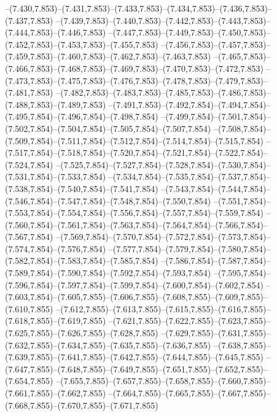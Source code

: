   --(7.430,7.853)--(7.431,7.853)--(7.433,7.853)--(7.434,7.853)--(7.436,7.853)--(7.437,7.853)%
  --(7.439,7.853)--(7.440,7.853)--(7.442,7.853)--(7.443,7.853)--(7.444,7.853)--(7.446,7.853)%
  --(7.447,7.853)--(7.449,7.853)--(7.450,7.853)--(7.452,7.853)--(7.453,7.853)--(7.455,7.853)%
  --(7.456,7.853)--(7.457,7.853)--(7.459,7.853)--(7.460,7.853)--(7.462,7.853)--(7.463,7.853)%
  --(7.465,7.853)--(7.466,7.853)--(7.468,7.853)--(7.469,7.853)--(7.470,7.853)--(7.472,7.853)%
  --(7.473,7.853)--(7.475,7.853)--(7.476,7.853)--(7.478,7.853)--(7.479,7.853)--(7.481,7.853)%
  --(7.482,7.853)--(7.483,7.853)--(7.485,7.853)--(7.486,7.853)--(7.488,7.853)--(7.489,7.853)%
  --(7.491,7.853)--(7.492,7.854)--(7.494,7.854)--(7.495,7.854)--(7.496,7.854)--(7.498,7.854)%
  --(7.499,7.854)--(7.501,7.854)--(7.502,7.854)--(7.504,7.854)--(7.505,7.854)--(7.507,7.854)%
  --(7.508,7.854)--(7.509,7.854)--(7.511,7.854)--(7.512,7.854)--(7.514,7.854)--(7.515,7.854)%
  --(7.517,7.854)--(7.518,7.854)--(7.520,7.854)--(7.521,7.854)--(7.522,7.854)--(7.524,7.854)%
  --(7.525,7.854)--(7.527,7.854)--(7.528,7.854)--(7.530,7.854)--(7.531,7.854)--(7.533,7.854)%
  --(7.534,7.854)--(7.535,7.854)--(7.537,7.854)--(7.538,7.854)--(7.540,7.854)--(7.541,7.854)%
  --(7.543,7.854)--(7.544,7.854)--(7.546,7.854)--(7.547,7.854)--(7.548,7.854)--(7.550,7.854)%
  --(7.551,7.854)--(7.553,7.854)--(7.554,7.854)--(7.556,7.854)--(7.557,7.854)--(7.559,7.854)%
  --(7.560,7.854)--(7.561,7.854)--(7.563,7.854)--(7.564,7.854)--(7.566,7.854)--(7.567,7.854)%
  --(7.569,7.854)--(7.570,7.854)--(7.572,7.854)--(7.573,7.854)--(7.574,7.854)--(7.576,7.854)%
  --(7.577,7.854)--(7.579,7.854)--(7.580,7.854)--(7.582,7.854)--(7.583,7.854)--(7.585,7.854)%
  --(7.586,7.854)--(7.587,7.854)--(7.589,7.854)--(7.590,7.854)--(7.592,7.854)--(7.593,7.854)%
  --(7.595,7.854)--(7.596,7.854)--(7.597,7.854)--(7.599,7.854)--(7.600,7.854)--(7.602,7.854)%
  --(7.603,7.854)--(7.605,7.855)--(7.606,7.855)--(7.608,7.855)--(7.609,7.855)--(7.610,7.855)%
  --(7.612,7.855)--(7.613,7.855)--(7.615,7.855)--(7.616,7.855)--(7.618,7.855)--(7.619,7.855)%
  --(7.621,7.855)--(7.622,7.855)--(7.623,7.855)--(7.625,7.855)--(7.626,7.855)--(7.628,7.855)%
  --(7.629,7.855)--(7.631,7.855)--(7.632,7.855)--(7.634,7.855)--(7.635,7.855)--(7.636,7.855)%
  --(7.638,7.855)--(7.639,7.855)--(7.641,7.855)--(7.642,7.855)--(7.644,7.855)--(7.645,7.855)%
  --(7.647,7.855)--(7.648,7.855)--(7.649,7.855)--(7.651,7.855)--(7.652,7.855)--(7.654,7.855)%
  --(7.655,7.855)--(7.657,7.855)--(7.658,7.855)--(7.660,7.855)--(7.661,7.855)--(7.662,7.855)%
  --(7.664,7.855)--(7.665,7.855)--(7.667,7.855)--(7.668,7.855)--(7.670,7.855)--(7.671,7.855)%

